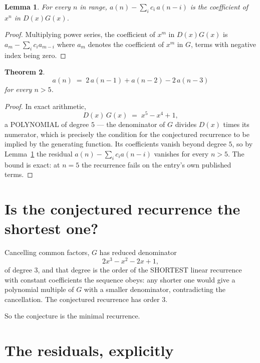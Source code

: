 \documentclass[11pt,a4paper]{article}
\theoremstyle{plain}
\newtheorem{theorem}{Theorem}
\newtheorem{lemma}[theorem]{Lemma}
\theoremstyle{definition}
\begin{document}
\begin{lemma}\label{lem:key}
For every $n$ in range, $a(n)-\sum_i c_i\,a(n-i)$ is the coefficient of $x^{n}$ in
$D(x)G(x)$.
\end{lemma}

\begin{proof}
Multiplying power series, the coefficient of $x^{m}$ in $D(x)G(x)$ is
$a_m-\sum_i c_i a_{m-i}$ where $a_m$ denotes the coefficient of $x^{m}$ in $G$, terms with
negative index being zero.
\end{proof}

\begin{theorem}
\[
a(n)\;=\;2\,a(n-1) + a(n-2) - 2\,a(n-3)
\]
for every $n>5$.
\end{theorem}

\begin{proof}
In exact arithmetic,
\[
D(x)\,G(x)\;=\;x^{5} - x^{4} + 1,
\]
a POLYNOMIAL of degree $5$ --- the denominator of $G$ divides $D(x)$ times its numerator,
which is precisely the condition for the conjectured recurrence to be implied by the
generating function. Its coefficients vanish beyond degree $5$, so by
Lemma~\ref{lem:key} the residual $a(n)-\sum_ic_ia(n-i)$ vanishes for every
$n>5$. The bound is exact: at $n=5$ the recurrence fails on the entry's own published terms.
\end{proof}

\section{Is the conjectured recurrence the shortest one?}

Cancelling common factors, $G$ has reduced denominator
\[
2 x^{3} - x^{2} - 2 x + 1,
\]
of degree $3$, and that degree is the order of the SHORTEST linear recurrence with
constant coefficients the sequence obeys: any shorter one would give a polynomial multiple of
$G$ with a smaller denominator, contradicting the cancellation. The conjectured recurrence has
order $3$.

So the conjecture is the minimal recurrence.

\section{The residuals, explicitly}
\end{document}
